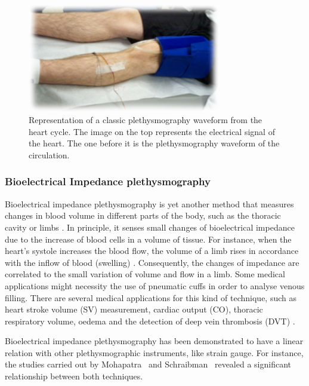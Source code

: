 \begin{figure}[!htpb]
	\centering
	\includegraphics[width=0.75\textwidth,keepaspectratio,trim={0.5cm 0.5cm 0.5cm 0.5cm}, clip]{figure6}    
	\caption[Strain gauge plethysmography]{Representation of a classic plethysmography waveform from the heart cycle. The image on the top represents the electrical signal of the heart. The one before it is the plethysmography waveform of the circulation.}
	\label{fig:strain gauge}
\end{figure}

\subsubsection{Bioelectrical Impedance plethysmography}
\label{section literature BI}
Bioelectrical impedance plethysmography is yet another method that measures changes in blood volume in different parts of the body, such as the thoracic cavity or limbs \cite{bera2014bioelectrical}. In principle, it senses small changes of bioelectrical impedance due to the increase of blood cells in a volume of tissue. For instance, when the heart's systole increases the blood flow, the volume of a limb rises in accordance with the inflow of blood (swelling) \cite{martinsen2011bioimpedance}. Consequently, the changes of impedance are correlated to the small variation of volume and flow in a limb. Some medical applications might necessity the use of pneumatic cuffs in order to analyse venous filling. There are several medical applications for this kind of technique, such as heart stroke volume (SV) measurement, cardiac output (CO), thoracic respiratory volume, oedema and the detection of deep vein thrombosis (DVT) \cite{holohan1996plethysmography}. 

Bioelectrical impedance plethysmography has been demonstrated to have a linear relation with other plethysmographic instruments, like strain gauge. For instance, the studies carried out by Mohapatra~\cite{mohapatra1979measurement} and Schraibman~\cite{schraibman1975comparison} revealed a significant relationship between both techniques.

